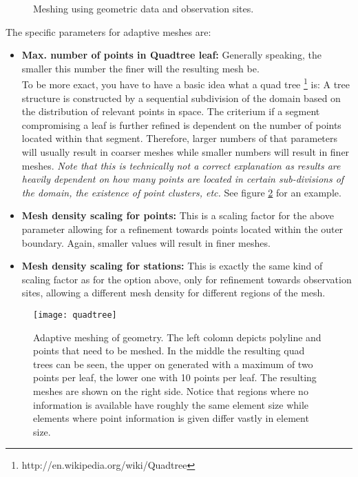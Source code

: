 \begin{figure}[tb]
\begin{center}
\enspace
{}\enspace
{}
\end{center}
\caption{Meshing using geometric data and observation sites.} \label{fig:meshing}
\end{figure}

The specific parameters for adaptive meshes are:
\begin{itemize}
\item \textbf{Max. number of points in Quadtree leaf:} Generally speaking, the smaller this number the finer will the resulting mesh be. \\
    To be more exact, you have to have a basic idea what a quad tree \footnote{http://en.wikipedia.org/wiki/Quadtree} is: A tree structure is constructed by a sequential subdivision of the domain based on the distribution of relevant points in space. The criterium if a segment compromising a leaf is further refined is dependent on the number of points located within that segment. Therefore, larger numbers of that parameters will usually result in coarser meshes while smaller numbers will result in finer meshes. \emph{Note that this is technically not a correct explanation as results are heavily dependent on how many points are located in certain sub-divisions of the domain, the existence of point clusters, etc.} See figure \ref{fig:quadtree} for an example.
\item \textbf{Mesh density scaling for points:} This is a scaling factor for the above parameter allowing for a refinement towards points located within the outer boundary. Again, smaller values will result in finer meshes.
\item \textbf{Mesh density scaling for stations:} This is exactly the same kind of scaling factor as for the option above, only for refinement towards observation sites, allowing a different mesh density for different regions of the mesh.
\end{itemize}

\begin{figure}[tb]
\begin{center}
\texttt{[image: quadtree]}\label{quadtree}
\end{center}
\caption{Adaptive meshing of geometry. The left colomn depicts polyline and points that need to be meshed. In the middle the resulting quad trees can be seen, the upper on generated with a maximum of two points per leaf, the lower one with 10 points per leaf. The resulting meshes are shown on the right side. Notice that regions where no information is available have roughly the same element size while elements where point information is given differ vastly in element size.} \label{fig:quadtree}
\end{figure}

